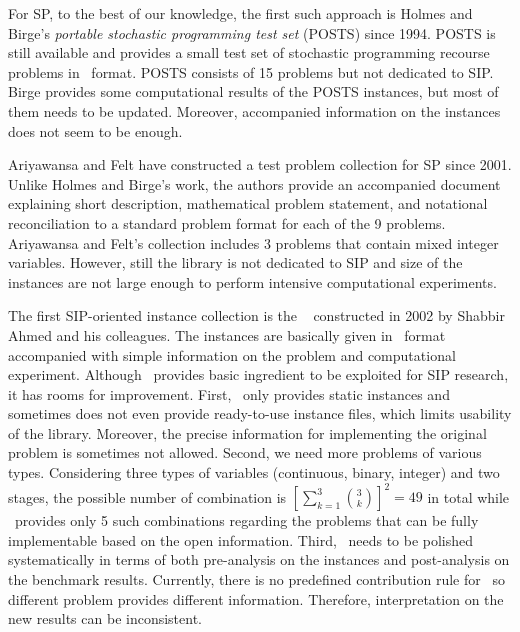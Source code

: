 For SP, to the best of our knowledge, the first such approach is Holmes and Birge's 
\textit{portable stochastic programming test set} (POSTS) \cite{POSTS} since 1994. POSTS is 
still available and provides a small test set of stochastic programming recourse problems in 
\smps\ format. POSTS consists of 15 problems but not dedicated to SIP. Birge 
\cite{POSTSresults} provides some computational results of the POSTS instances, but most of 
them needs to be updated. Moreover, accompanied information on the instances does not seem to 
be enough. 

Ariyawansa and Felt \cite{journal:AF2004} have constructed a test problem collection for SP 
since 2001. Unlike Holmes and Birge's work, the authors provide an accompanied document 
explaining short description, mathematical problem statement, and notational reconciliation 
to a standard problem format for each of the 9 problems. Ariyawansa and Felt's collection 
includes 3 problems that contain mixed integer variables. However, still the library is not 
dedicated to SIP and size of the instances are not large enough to perform intensive 
computational experiments. 

The first SIP-oriented instance collection is the \siplib\ \cite{web:SIPLIB1} constructed in 
2002 by Shabbir Ahmed and his colleagues. The instances are basically given in \smps\ format 
accompanied with simple information on the problem and computational experiment. Although 
\siplib\ provides basic ingredient to be exploited for SIP research, it has rooms for 
improvement. First, \siplib\ only provides static instances and sometimes does not even 
provide ready-to-use instance files, which limits usability of the library. Moreover, the 
precise information for implementing the original problem is sometimes not allowed. Second, 
we need more problems of various types. Considering three types of variables (continuous, 
binary, integer) and two stages, the possible number of combination is $\left[\sum_{k=1}
^3\binom{3}{k}\right]^2=49$ in total while \siplib\ provides only 5 such combinations 
regarding the problems that can be fully implementable based on the open information.
Third, \siplib\ needs to be polished systematically in terms of both pre-analysis on the 
instances and post-analysis on the benchmark results. Currently, there is no predefined 
contribution rule for \siplib\ so different problem provides different information. 
Therefore, interpretation on the new results can be inconsistent.

